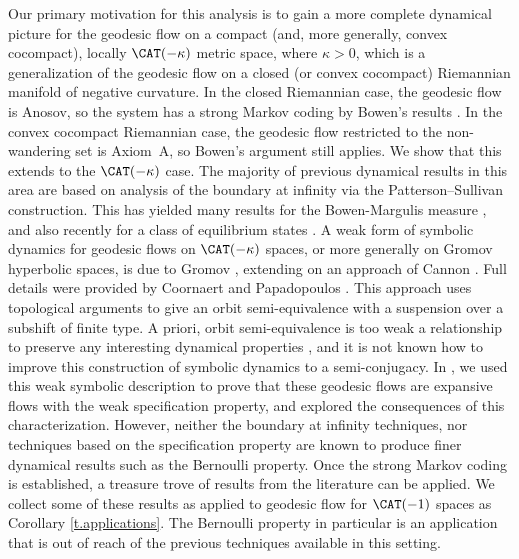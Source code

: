Our primary motivation for this analysis is to gain a more complete dynamical picture for the geodesic flow on a compact (and, more generally, convex cocompact), locally $\CAT(-\kappa)$ metric space, where $\kappa>0$, which is a generalization of the geodesic flow on a closed (or convex cocompact) Riemannian manifold of negative curvature. In the closed Riemannian case, the geodesic flow is Anosov, so the system has a strong Markov coding by Bowen's results \cite{bowen-symbolic}. In the convex cocompact Riemannian case, the geodesic flow restricted to the non-wandering set is Axiom~A, so Bowen's argument still applies. We show that this extends to the $\CAT(-\kappa)$ case. The majority of previous dynamical results in this area are based on analysis of the boundary at infinity via the Patterson--Sullivan construction. This has yielded many results for the Bowen-Margulis measure \cite{Roblin}, and also recently for a class of equilibrium states \cite{BPP16}. A weak form of symbolic dynamics for geodesic flows on $\CAT(-\kappa)$ spaces, or more generally on Gromov hyperbolic spaces, is due to Gromov \cite{gromov}, extending on an approach of Cannon \cite{Cannon}. Full details were provided by Coornaert and Papadopoulos \cite{cp}. This approach uses topological arguments to give an orbit semi-equivalence with a suspension over a subshift of finite type. A priori, orbit semi-equivalence is too weak a relationship to preserve any interesting dynamical properties \cite{GM, KT17}, and it is not known how to improve this construction of symbolic dynamics to a semi-conjugacy. In \cite{CLT}, we used this weak symbolic description to prove that these geodesic flows are expansive flows with the weak specification property, and explored the consequences of this characterization. However, neither the boundary at infinity techniques, nor techniques based on the specification property are known to produce finer dynamical results such as the Bernoulli property. Once the strong Markov coding is established, a treasure trove of results from the literature can be applied. We collect some of these results as applied to geodesic flow for $\CAT(-1)$ spaces as Corollary \ref{t.applications}. The Bernoulli property in particular is an application that is out of reach of the previous techniques available in this setting.

